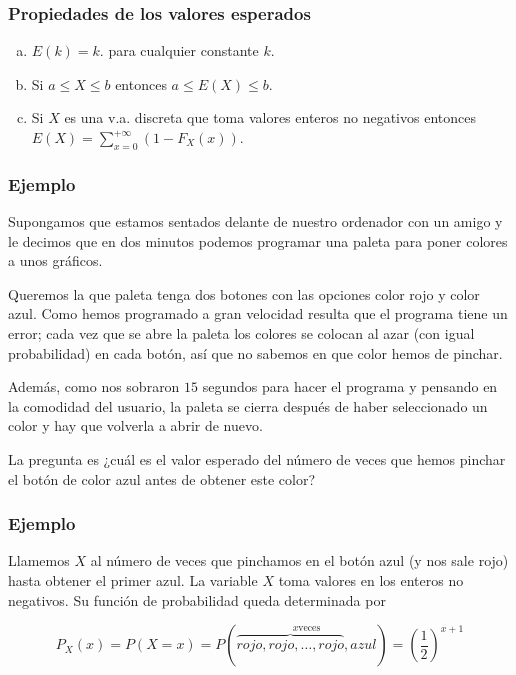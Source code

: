 \documentclass[handout]{beamer}\usepackage[]{graphicx}\usepackage[]{color}
\renewcommand{\leq}{\leqslant}
\theoremstyle{plain}
\theoremstyle{definition}
\begin{document}
\begin{frame}
\frametitle{Propiedades de los valores esperados}

\begin{enumerate}[a)]
\item $E(k)=k.$ para cualquier constante $k$.
\item Si $a\leq X\leq b$ entonces $a\leq E(X)\leq b$.
\item Si $X$ es una v.a. discreta que toma valores enteros no negativos entonces
$E(X)=\sum_{x=0}^{+\infty}(1- F_X(x)).$
\end{enumerate}

\end{frame}



\begin{frame}
\frametitle{Ejemplo}
Supongamos que estamos sentados delante de nuestro ordenador con un amigo y
le decimos que en dos minutos podemos programar una paleta  para poner colores a unos
gráficos. 

Queremos la que paleta tenga dos botones con las opciones color rojo y color azul.
Como hemos programado a gran velocidad resulta que el programa tiene un error; cada vez que
se abre la paleta los colores se colocan al azar (con igual probabilidad) en cada botón,
así que no sabemos en que color hemos de pinchar. 

Además, como nos sobraron $15$ segundos
para hacer el programa y pensando en la  comodidad del usuario, la paleta se cierra después de haber seleccionado  un
color y hay que volverla a abrir de nuevo.

La pregunta es ¿cuál es el valor esperado del
número de veces que hemos pinchar el botón de color azul antes de obtener este color?
\end{frame}


\begin{frame}
\frametitle{Ejemplo}

Llamemos $X$ al número de veces que pinchamos en el botón azul (y nos sale rojo) hasta
obtener el primer azul. La variable $X$ toma valores en los enteros no negativos. Su
función de probabilidad queda determinada por

$$P_X(x)=P(X=x)=P(\stackrel{x \mbox{veces}}{\overbrace{rojo, rojo,\ldots,rojo},azul})
=\left(\frac{1}{2}\right)^{x+1}$$
\end{frame}
\end{document}
